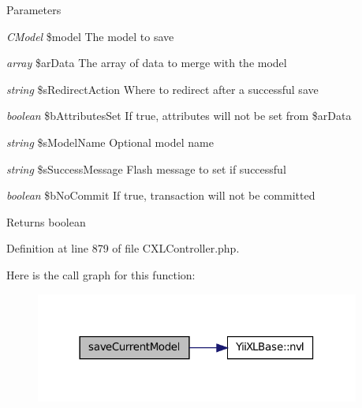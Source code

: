 \begin{DoxyParams}{Parameters}
\item[{\em CModel}]\$model The model to save \item[{\em array}]\$arData The array of data to merge with the model \item[{\em string}]\$sRedirectAction Where to redirect after a successful save \item[{\em boolean}]\$bAttributesSet If true, attributes will not be set from \$arData \item[{\em string}]\$sModelName Optional model name \item[{\em string}]\$sSuccessMessage Flash message to set if successful \item[{\em boolean}]\$bNoCommit If true, transaction will not be committed \end{DoxyParams}
\begin{DoxyReturn}{Returns}
boolean 
\end{DoxyReturn}


Definition at line 879 of file CXLController.php.








Here is the call graph for this function:\nopagebreak
\begin{figure}[H]
\begin{center}
\leavevmode
\includegraphics[width=302pt]{classCXLController_af6aedd6d8077a2728f4e7f1fad56d5a2_cgraph}
\end{center}
\end{figure}




